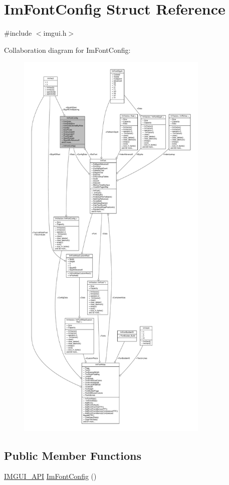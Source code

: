 \hypertarget{structImFontConfig}{}\section{Im\+Font\+Config Struct Reference}
\label{structImFontConfig}


{\ttfamily \#include $<$imgui.\+h$>$}



Collaboration diagram for Im\+Font\+Config\+:
\nopagebreak
\begin{figure}[H]
\begin{center}
\leavevmode
\includegraphics[height=550pt]{structImFontConfig__coll__graph}
\end{center}
\end{figure}
\subsection*{Public Member Functions}
\begin{DoxyCompactItemize}
\item 
\hyperlink{imgui_8h_a43829975e84e45d1149597467a14bbf5}{I\+M\+G\+U\+I\+\_\+\+A\+PI} \hyperlink{structImFontConfig_af56ce39ce94ce0fb5171f4d8aa93f79c}{Im\+Font\+Config} ()
\end{DoxyCompactItemize}
